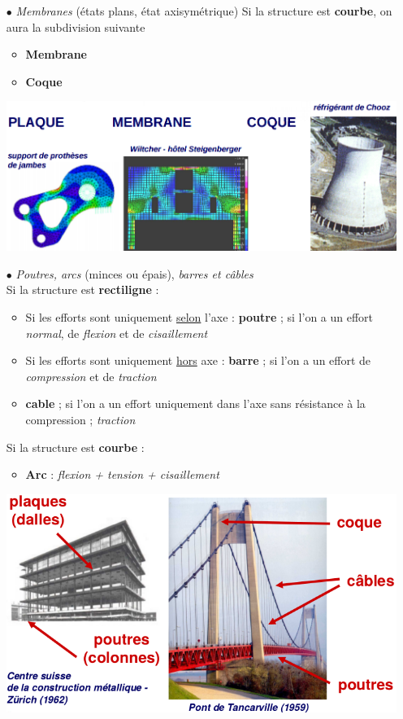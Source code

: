 \begin{itemize}
\item[$\bullet$] \textit{Membranes} (états plans, état axisymétrique)
Si la structure est \textbf{courbe}, on aura la subdivision suivante 
	\begin{itemize}
	\item \textbf{Membrane}
	\item \textbf{Coque}
	\end{itemize}
\begin{center}
\includegraphics[scale=0.4]{ch1/image1}
\end{center}
\newpage
\item[$\bullet$] \textit{Poutres, arcs} (minces ou épais), \textit{
barres et câbles}\\
Si la structure est \textbf{rectiligne} :
	\begin{itemize}
	\item Si les efforts sont uniquement \underline{selon} l'axe : 
	\textbf{poutre} ;  si l'on a un effort \textit{normal}, de 
	\textit{flexion} et de \textit{cisaillement}
	\item Si les efforts sont uniquement \underline{hors} axe : 
	\textbf{barre}	;  si l'on a un effort de \textit{compression} 
	et de \textit{traction}
	\item \textbf{cable}	;  si l'on a un effort uniquement dans l'axe 
	sans résistance à la compression ; \textit{traction}
	\end{itemize}
Si la structure est \textbf{courbe} :
	\begin{itemize}
	\item \textbf{Arc } : \textit{flexion + tension + cisaillement}
	\end{itemize}	
	
\begin{center}
\includegraphics[scale=0.5]{ch1/image2}
\end{center}
\end{itemize}



